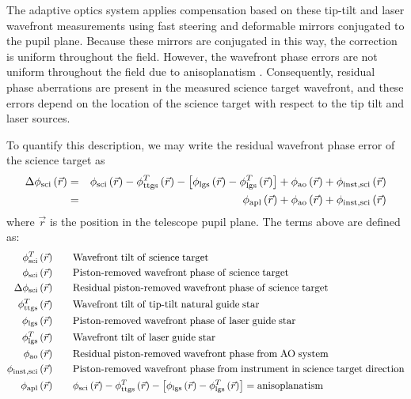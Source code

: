 The adaptive optics system applies compensation based on these
tip-tilt and laser wavefront measurements using fast steering and
deformable mirrors conjugated to the pupil plane.  Because these
mirrors are conjugated in this way, the correction is uniform
throughout the field.  However, the wavefront phase errors are not
uniform throughout the field due to anisoplanatism \cite{Fried:1982}.
Consequently, residual phase aberrations are present in the measured
science target wavefront, and these errors depend on the location of
the science target with respect to the tip tilt and laser sources.

To quantify this description, we may write the residual wavefront
phase error of the science target as
\begin{eqnarray}\label{eqn:phdiff}
\Delta\phi_{\rm sci}\left(\vec{r}\right) & = & \phi_{\rm sci}\left(\vec{r}\right) - \phi^{T}_{\rm ttgs}\left(\vec{r}\right) - 
\left[\phi_{\rm lgs}\left(\vec{r}\right) - \phi^{T}_{\rm lgs}\left(\vec{r}\right)\right] + \phi_{\rm ao}\left(\vec{r}\right) + 
\phi_{\rm inst,sci}\left(\vec{r}\right) \\
& = & \phi_{\rm apl}\left(\vec{r}\right) + \phi_{\rm ao}\left(\vec{r}\right)  + \phi_{\rm inst,sci}\left(\vec{r}\right) \nonumber
\end{eqnarray}
where $\vec{r}$ is the position in the telescope pupil plane. 
The terms above are defined as: 
\begin{equation}\label{eqn:phidefs}
\begin{aligned}
\phi^{T}_{\rm sci}\left(\vec{r}\right)  \quad & \quad  
{\rm Wavefront\; tilt\; of\; science\; target}  \\
\phi_{\rm sci}\left(\vec{r}\right)  \quad & \quad  
{\rm Piston\text{-}removed\; wavefront\; phase\; of\; science\; target}  \\
\Delta\phi_{\rm sci}\left(\vec{r}\right)  \quad & \quad  
{\rm Residual\; piston\text{-}removed\; wavefront\; phase\; of\; science\; target} \\
\phi^{T}_{\rm ttgs}\left(\vec{r}\right)  \quad & \quad  
{\rm Wavefront\; tilt\; of\; tip\text{-}tilt\; natural\; guide\; star}  \\
\phi_{\rm lgs}\left(\vec{r}\right)  \quad & \quad  
{\rm Piston\text{-}removed\; wavefront\; phase\; of\; laser\; guide\; star}  \\
\phi^{T}_{\rm lgs}\left(\vec{r}\right)  \quad & \quad  
{\rm Wavefront\; tilt\; of\; laser\; guide\; star}  \\
\phi_{\rm ao}\left(\vec{r}\right)  \quad & \quad  
{\rm Residual\; piston\text{-}removed\; wavefront\; phase\; from\; AO\; system}  \\
\phi_{\rm inst,sci}\left(\vec{r}\right)  \quad & \quad  
{\rm Piston\text{-}removed\; wavefront\; phase\; from\; instrument\; in\; science\; target\; direction}  \\
\phi_{\rm apl}\left(\vec{r}\right)  \quad & \quad  \phi_{\rm sci}\left(\vec{r}\right) - \phi^{T}_{\rm ttgs}\left(\vec{r}\right) - 
\left[\phi_{\rm lgs}\left(\vec{r}\right) - \phi^{T}_{\rm lgs}\left(\vec{r}\right)\right] = 
{\rm anisoplanatism}
\end{aligned}
\end{equation}
